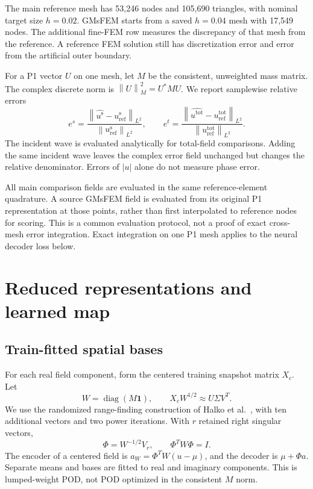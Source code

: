 \documentclass{article}
\newcommand{\norm}[1]{\left\lVert#1\right\rVert}
\newcommand{\us}{u^{\mathrm{s}}}
\newcommand{\ut}{u^{\mathrm{tot}}}
\begin{document}
The main reference mesh has 53,246 nodes and 105,690 triangles, with nominal target size $h=0.02$. GMsFEM starts from a saved $h=0.04$ mesh with 17,549 nodes. The additional fine-FEM row measures the discrepancy of that mesh from the reference. A reference FEM solution still has discretization error and error from the artificial outer boundary.

For a P1 vector $U$ on one mesh, let $M$ be the consistent, unweighted mass matrix. The complex discrete norm is $\norm{U}_M^2=U^*MU$. We report samplewise relative errors
\begin{equation}
e^s=\frac{\norm{\widehat{\us}-\us_{\mathrm{ref}}}_{L^2}}
{\norm{\us_{\mathrm{ref}}}_{L^2}},\qquad
e^t=\frac{\norm{\widehat{\ut}-\ut_{\mathrm{ref}}}_{L^2}}
{\norm{\ut_{\mathrm{ref}}}_{L^2}}.
\label{eq:error}
\end{equation}
The incident wave is evaluated analytically for total-field comparisons. Adding the same incident wave leaves the complex error field unchanged but changes the relative denominator. Errors of $|u|$ alone do not measure phase error.

All main comparison fields are evaluated in the same reference-element quadrature. A source GMsFEM field is evaluated from its original P1 representation at those points, rather than first interpolated to reference nodes for scoring. This is a common evaluation protocol, not a proof of exact cross-mesh error integration. Exact integration on one P1 mesh applies to the neural decoder loss below.

\section{Reduced representations and learned map}
\subsection{Train-fitted spatial bases}
For each real field component, form the centered training snapshot matrix $X_c$. Let
\begin{equation}
W=\operatorname{diag}(M\mathbf{1}),\qquad
X_cW^{1/2}\approx U\Sigma V^T.
\end{equation}
We use the randomized range-finding construction of Halko et al.~\cite{halko2011}, with ten additional vectors and two power iterations. With $r$ retained right singular vectors,
\begin{equation}
\Phi=W^{-1/2}V_r,\qquad \Phi^TW\Phi=I.
\label{eq:pod}
\end{equation}
The encoder of a centered field is $a_W=\Phi^TW(u-\mu)$, and the decoder is $\mu+\Phi a$. Separate means and bases are fitted to real and imaginary components. This is lumped-weight POD, not POD optimized in the consistent $M$ norm.
\end{document}
